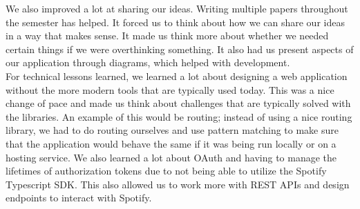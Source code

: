 \documentclass{article}
\begin{document}
We also improved a lot at sharing our ideas. Writing multiple papers throughout the semester has helped. It forced us to think about how we can share our ideas in a way that makes sense. It made us think more about whether we needed certain things if we were overthinking something. It also had us present aspects of our application through diagrams, which helped with development. \\

For technical lessons learned, we learned a lot about designing a web application without the more modern tools that are typically used today. This was a nice change of pace and made us think about challenges that are typically solved with the libraries. An example of this would be routing; instead of using a nice routing library, we had to do routing ourselves and use pattern matching to make sure that the application would behave the same if it was being run locally or on a hosting service. We also learned a lot about OAuth and having to manage the lifetimes of authorization tokens due to not being able to utilize the Spotify Typescript SDK. This also allowed us to work more with REST APIs and design endpoints to interact with Spotify.
\end{document}

